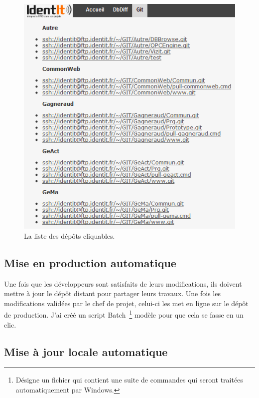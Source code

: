 \begin{figure}
    \begin{center}
        \includegraphics[scale=0.8]{images/repo.png}
        \caption{La liste des dépôts cliquables.}
        \label{repo}
    \end{center}
\end{figure}

\newpage

\subsection{Mise en production automatique} %
\label{sub:Mise en production automatique}

Une fois que les développeurs sont satisfaits de leurs modifications,
ils doivent mettre à jour le dépôt distant pour partager leurs travaux.
Une fois les modifications validées par le chef de projet, celui-ci les
met en ligne sur le dépôt de production. J'ai créé un script Batch\,
\footnote{Désigne un fichier qui contient une suite de commandes qui
seront traitées automatiquement par Windows.} \og modèle \fg{} pour que
cela se fasse en un clic.

\subsection{Mise à jour locale automatique} %
\label{sub:Mise à jour locale automatique}

